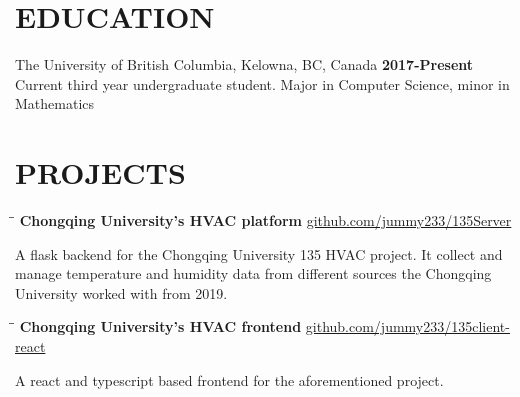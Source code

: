 \documentclass{res}
\begin{document}

\address{jimmy123good@hotmail.com \\ github.com/ailrk\\ ailrk.github.io/home \\ (250) 899 2600}
\begin{resume}

\section{EDUCATION}
The University of British Columbia, Kelowna, BC, Canada  \hspace{1.2in} \textbf{2017-Present}\\
    Current third year undergraduate student. Major in Computer Science, minor in Mathematics \\

\section{PROJECTS}

    \vspace{-0.1in}
    \begin{tabbing}
        \hspace{2.4in}\= \hspace{0.9in}\= \kill
        {\bf Chongqing University's HVAC platform} \>                   \>\url{github.com/jummy233/135Server}\\
    \end{tabbing}\vspace{-30pt}
    A flask backend for the Chongqing University 135 HVAC project. It collect and manage temperature and humidity data from
    different sources the Chongqing University worked with from 2019.

    \vspace{-0.2in}
    \begin{tabbing}
        \hspace{2.4in}\= \hspace{0.9in}\= \kill
        {\bf Chongqing University's HVAC frontend} \>                   \>\url{github.com/jummy233/135client-react}\\
    \end{tabbing}\vspace{-30pt}
    A react and typescript based frontend for the aforementioned project.


\end{resume}
\end{document}
